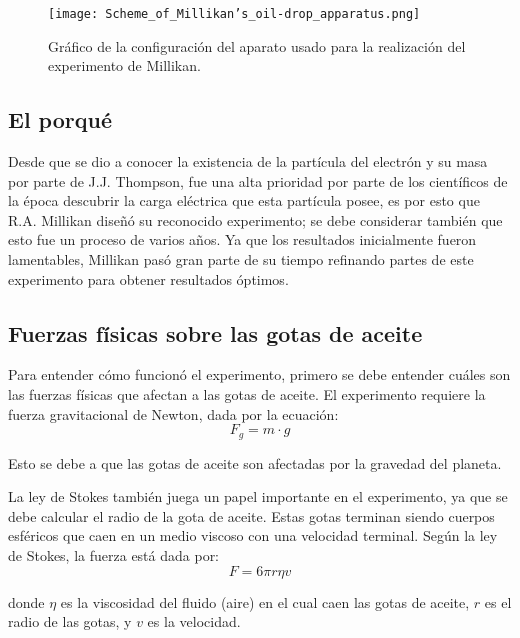 \documentclass[
 reprint,
 amsmath,amssymb,
 aps,
]{revtex4-2}
\begin{document}
\begin{figure}[H]
    \centering
    \texttt{[image: Scheme\_of\_Millikan’s\_oil-drop\_apparatus.png]}
    \caption{Gráfico de la configuración del aparato usado para la realización del experimento de Millikan.\cite{millikan1913}}
    \label{fig:aparato}
\end{figure}


\subsection{\label{sec:citeref}El porqué}
Desde que se dio a conocer la existencia de la partícula del electrón y su masa por parte de J.J. Thompson, fue una alta prioridad por parte de los científicos de la época descubrir la carga eléctrica que esta partícula posee, es por esto que R.A. Millikan diseñó su reconocido experimento; se debe considerar también que esto fue un proceso de varios años. Ya que los resultados inicialmente fueron lamentables, Millikan pasó gran parte de su tiempo refinando partes de este experimento para obtener resultados óptimos.\cite{hector2020}



\subsection{\label{sec:citeref}Fuerzas físicas sobre las gotas de aceite}
Para entender cómo funcionó el experimento, primero se debe entender cuáles son las fuerzas físicas que afectan a las gotas de aceite. El experimento requiere la fuerza gravitacional de Newton, dada por la ecuación:
\begin{equation}
F_g = m \cdot g
\label{eq:Fg}
\end{equation}

Esto se debe a que las gotas de aceite son afectadas por la gravedad del planeta.

La ley de Stokes también juega un papel importante en el experimento, ya que se debe calcular el radio de la gota de aceite. Estas gotas terminan siendo cuerpos esféricos que caen en un medio viscoso con una velocidad terminal. Según la ley de Stokes, la fuerza está dada por:
\begin{equation}
F = 6 \pi r \eta v
\label{eq:Fv}
\end{equation}

donde \(\eta\) es la viscosidad del fluido (aire) en el cual caen las gotas de aceite, \(r\) es el radio de las gotas, y \(v\) es la velocidad.
\end{document}
